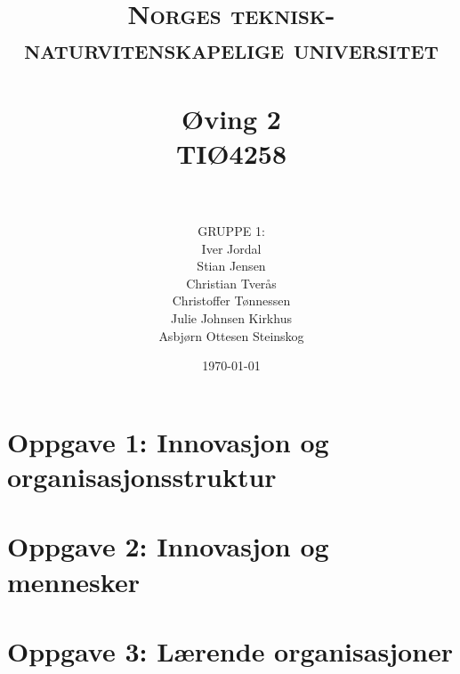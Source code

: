 \documentclass[paper=a4, fontsize=11pt]{scrartcl} %
\title{ 
\normalfont \normalsize 
\textsc{Norges teknisk-naturvitenskapelige universitet} \\ [25pt] %
\horrule{0.4pt} \\[0.4cm] %
\huge \textbf{Øving 2} \\ %
TIØ4258 \\
\horrule{1pt} \\[0.5cm] %
}
\author{\normalsize GRUPPE 1:\\Iver Jordal\\Stian Jensen\\Christian Tverås\\Christoffer Tønnessen\\Julie Johnsen Kirkhus\\Asbjørn Ottesen Steinskog}
\date{\normalsize \today}
\numberwithin{equation}{section} %
\numberwithin{figure}{section} %
\numberwithin{table}{section} %
\begin{document}
\maketitle

\thispagestyle{firststyle}

\setcounter{secnumdepth}{3}


\section{Oppgave 1: Innovasjon og organisasjonsstruktur}


\section{Oppgave 2: Innovasjon og mennesker}


\section{Oppgave 3: Lærende organisasjoner}

\end{document}
